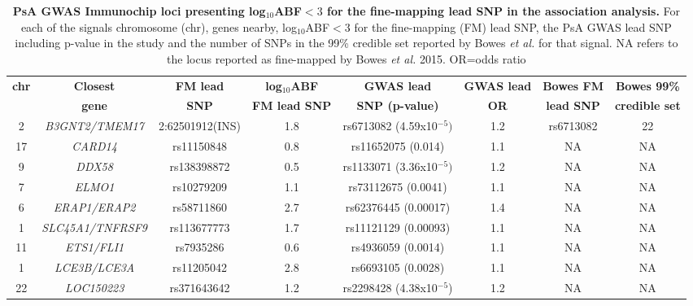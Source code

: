 \begin{landscape}
\begin{center}
\begin{longtable}[ht]{c c c c c c c c}
\caption[PsA GWAS Immunochip loci presenting log$_{10}$ABF$<3$ for the fine-mapping lead SNP in the association analysis.]{\textbf{PsA GWAS Immunochip loci presenting log$_{10}$ABF$<3$ for the fine-mapping lead SNP in the association analysis.} For each of the signals chromosome (chr), genes nearby, log$_{10}$ABF$<3$ for the fine-mapping (FM) lead SNP, the PsA GWAS lead SNP including p-value in the study and the number of SNPs in the 99\% credible set reported by Bowes \textit{et al.} for that signal. NA refers to the locus reported as fine-mapped by Bowes \textit{et al.} 2015. OR=odds ratio}
\label{tab:PsA_loci_no_fine_mapping}\\
\toprule
\textbf{chr} & \textbf{Closest} & \textbf{FM lead} &\textbf{log$_{10}$ABF} & \textbf{GWAS lead}  &  \textbf{GWAS lead}   &\textbf{Bowes FM} & \textbf{Bowes 99\%} \\
             & \textbf{gene} & \textbf{SNP}    &\textbf{FM lead SNP}   & \textbf{SNP (p-value)} &  \textbf{OR}          &\textbf{lead SNP} & \textbf{credible set} \\
\midrule
\midrule
2	 & \textit{B3GNT2/TMEM17} & 2:62501912(INS)  &1.8   & rs6713082 (4.59x10$^{-5})$ & 1.2 &rs6713082	& 22 \\
17 & \textit{CARD14}	      & rs11150848 &0.8  & rs11652075 (0.014)       &  1.1  &NA	& NA \\
9	 & \textit{DDX58}	        &rs138398872&	0.5   & rs1133071 (3.36x10$^{-5})$ & 1.2 &	NA	&NA \\
7	 & \textit{ELMO1}	        &rs10279209&	1.1   & rs73112675 (0.0041)        &	1.1 &NA	& NA \\
6	 & \textit{ERAP1/ERAP2}	  &rs58711860&	2.7 	& rs62376445 (0.00017) & 1.4 &	NA	&NA \\
1	 & \textit{SLC45A1/TNFRSF9} &rs113677773	&	1.7 &	rs11121129 (0.00093) & 1.1 & NA	& NA \\
11 & \textit{ETS1/FLI1}	    &rs7935286&	0.6   & rs4936059 (0.0014)	& 1.1  & NA  &	NA \\ 
1	 & \textit{LCE3B/LCE3A}	  &rs11205042&	2.8 	& rs6693105 (0.0028)	& 1.1 & NA	& NA \\
22 & \textit{LOC150223}	    &rs371643642&	1.2   & rs2298428 (4.38x10$^{-5}$) & 1.2	& NA	& NA \\

\end{longtable}
\end{center}
\end{landscape}

